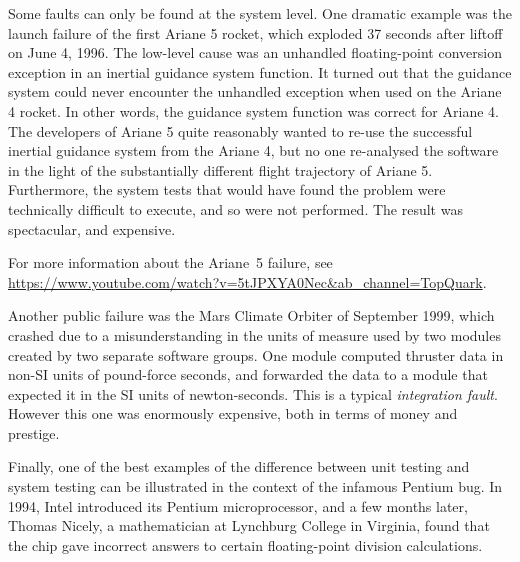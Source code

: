 


Some faults can only be found at the system level. One dramatic example was the
launch failure of the first Ariane 5 rocket, which exploded 37 seconds after
liftoff on June 4, 1996. The low-level cause was an unhandled floating-point
conversion exception in an inertial guidance system function. It turned out that
the guidance system could never encounter the unhandled exception when used on
the Ariane 4 rocket. In other words, the guidance system function was correct
for Ariane 4. The developers of Ariane 5 quite reasonably wanted to re-use the
successful inertial guidance system from the Ariane 4, but no one re-analysed
the software in the light of the substantially different flight trajectory of
Ariane 5. Furthermore, the system tests that would have found the problem were
technically difficult to execute, and so were not performed. The result was
spectacular, and expensive.


For more information about the Ariane~5 failure, see 
\url{https://www.youtube.com/watch?v=5tJPXYA0Nec&ab_channel=TopQuark}.


Another public failure was the Mars Climate Orbiter of September 1999, which
crashed due to a misunderstanding in the units of measure used by two modules
created by two separate software groups. One module computed thruster data in
non-SI units of pound-force seconds, and forwarded the data to a module that 
expected it in the SI units of newton-seconds. This is a typical {\it
integration fault}. However this one was enormously expensive, both in terms of
money and prestige.


Finally, one of the best examples of the difference between unit testing and
system testing can be illustrated in the context of the infamous Pentium bug. In
1994, Intel introduced its Pentium microprocessor, and a few months later,
Thomas Nicely, a mathematician at Lynchburg College in Virginia, found that the
chip gave incorrect answers to certain floating-point division calculations. 

